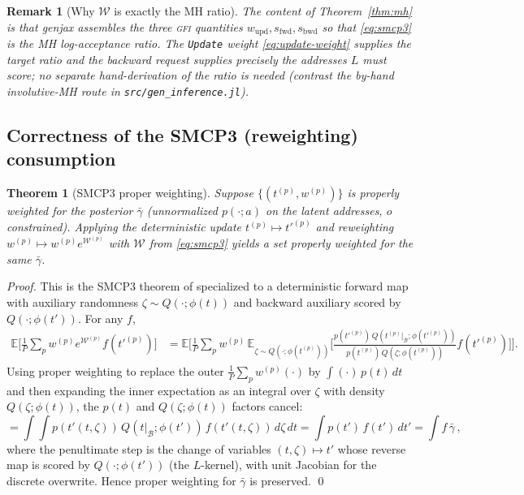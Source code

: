 \documentclass[11pt]{article}
\newcommand{\GFI}{\textsc{gfi}}
\newcommand{\code}[1]{\texttt{#1}}
\newtheorem{theorem}{Theorem}
\newtheorem{remark}{Remark}
\begin{document}
\begin{remark}[Why $\mathcal W$ is exactly the MH ratio]
The content of Theorem~\ref{thm:mh} is that genjax assembles the three \GFI{} quantities
$w_{\mathrm{upd}}, s_{\mathrm{fwd}}, s_{\mathrm{bwd}}$ so that \eqref{eq:smcp3} \emph{is} the MH
log-acceptance ratio. The \code{Update} weight \eqref{eq:update-weight} supplies the target ratio and
the backward request supplies precisely the addresses $L$ must score; no separate hand-derivation of
the ratio is needed (contrast the by-hand involutive-MH route in \code{src/gen\_inference.jl}).
\end{remark}

\subsection{Correctness of the SMCP3 (reweighting) consumption}

\begin{theorem}[SMCP3 proper weighting]\label{thm:rejuv-smcp3}
Suppose $\{(t^{(p)}, w^{(p)})\}$ is properly weighted for the posterior $\bar\gamma$ (unnormalized
$p(\cdot;a)$ on the latent addresses, $o$ constrained). Applying the deterministic update
$t^{(p)}\!\mapsto t'^{(p)}$ and reweighting $w^{(p)}\!\mapsto w^{(p)}e^{\mathcal W^{(p)}}$ with
$\mathcal W$ from \eqref{eq:smcp3} yields a set properly weighted for the same $\bar\gamma$.
\end{theorem}

\begin{proof}
This is the SMCP3 theorem of \cite{smcp3} specialized to a deterministic forward map with auxiliary
randomness $\zeta\sim Q(\cdot;\phi(t))$ and backward auxiliary scored by $Q(\cdot;\phi(t'))$. For any
$f$,
\begin{align*}
  \mathbb{E}\Big[\tfrac1P\!\sum_p w^{(p)} e^{\mathcal W^{(p)}} f(t'^{(p)})\Big]
  &= \mathbb{E}\Big[\tfrac1P\!\sum_p w^{(p)} \,\mathbb{E}_{\zeta\sim Q(\cdot;\phi(t^{(p)}))}\!\Big[ \tfrac{p(t'^{(p)})\,Q(t^{(p)}|_{\mathcal B};\phi(t'^{(p)}))}{p(t^{(p)})\,Q(\zeta;\phi(t^{(p)}))} f(t'^{(p)})\Big]\Big].
\end{align*}
Using proper weighting to replace the outer $\tfrac1P\sum_p w^{(p)}(\cdot)$ by
$\int(\cdot)\,p(t)\,dt$ and then expanding the inner expectation as an integral over $\zeta$ with
density $Q(\zeta;\phi(t))$, the $p(t)$ and $Q(\zeta;\phi(t))$ factors cancel:
\[
  = \int\!\!\int p(t'(t,\zeta))\,Q(t|_{\mathcal B};\phi(t'))\, f(t'(t,\zeta))\, d\zeta\,dt
  = \int p(t')\, f(t')\, dt' = \textstyle\int f\,\bar\gamma\,,
\]
where the penultimate step is the change of variables $(t,\zeta)\mapsto t'$ whose reverse map is
scored by $Q(\cdot;\phi(t'))$ (the $L$-kernel), with unit Jacobian for the discrete overwrite. Hence
proper weighting for $\bar\gamma$ is preserved. \qed
\end{proof}
\end{document}
